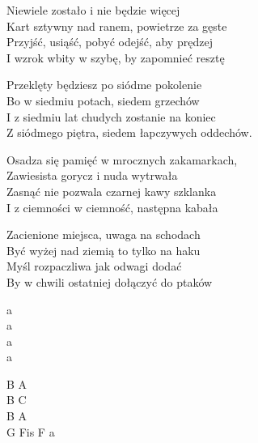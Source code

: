 \begin{text}
Niewiele zostało i nie będzie więcej\\
Kart sztywny nad ranem, powietrze za gęste\\
Przyjść, usiąść, pobyć odejść, aby prędzej\\
I wzrok wbity w szybę, by zapomnieć resztę

\vin Przeklęty będziesz po siódme pokolenie\\
\vin Bo w siedmiu potach, siedem grzechów\\
\vin I z siedmiu lat chudych zostanie na koniec\\
\vin Z siódmego piętra, siedem łapczywych oddechów.

Osadza się pamięć w mrocznych zakamarkach,\\
Zawiesista gorycz i nuda wytrwała\\
Zasnąć nie pozwala czarnej kawy szklanka\\
I z ciemności w ciemność, następna kabała

Zacienione miejsca, uwaga na schodach\\
Być wyżej nad ziemią to tylko na haku\\
Myśl rozpaczliwa jak odwagi dodać\\
By w chwili ostatniej dołączyć do ptaków
\end{text}
\begin{chord}
    a\\
    a\\
    a\\
    a

    B A\\
    B C\\
    B A\\
    G Fis F a
\end{chord}